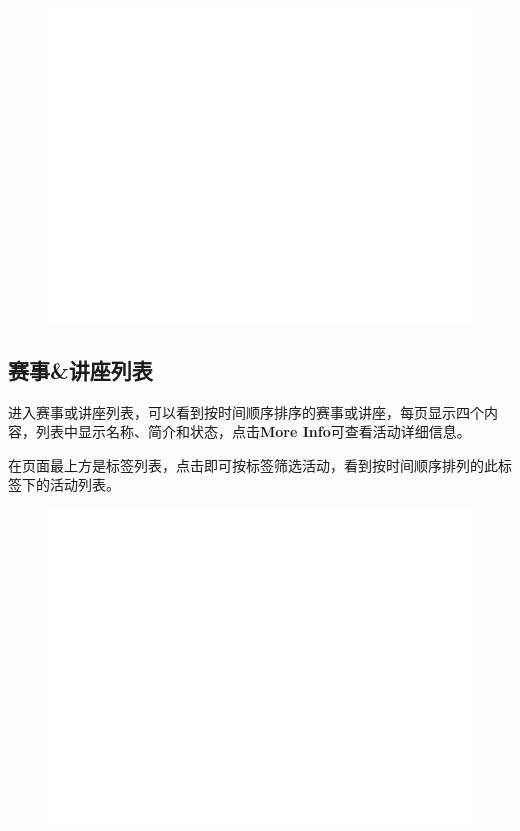 \documentclass[UTF8]{ctexart}
\begin{document}
\begin{figure}[h]
    \centering
    \includegraphics[width=\textwidth]{manual_images//temp.png}
\end{figure}

\newpage
\subsection{赛事\&讲座列表}

进入赛事或讲座列表，可以看到按时间顺序排序的赛事或讲座，每页显示四个内容，列表中显示名称、简介和状态，点击{\bfseries More Info}可查看活动详细信息。

在页面最上方是标签列表，点击即可按标签筛选活动，看到按时间顺序排列的此标签下的活动列表。
\begin{figure}[h]
    \centering
    \includegraphics[width=\textwidth]{manual_images//temp.png}
\end{figure}
\end{document}
